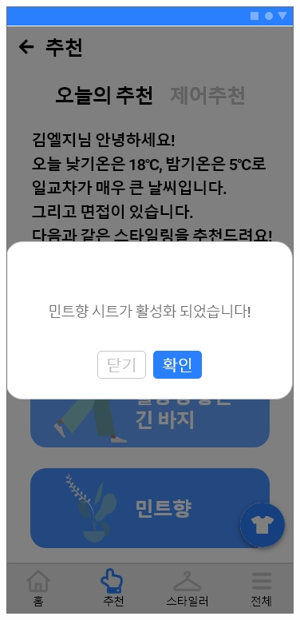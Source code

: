 \documentclass[conference]{IEEEtran}
\begin{document}
\begin{enumerate}
     \centerline{\includegraphics[scale=0.25]{추천4.jpg}
}
\end{enumerate}
\end{document}
